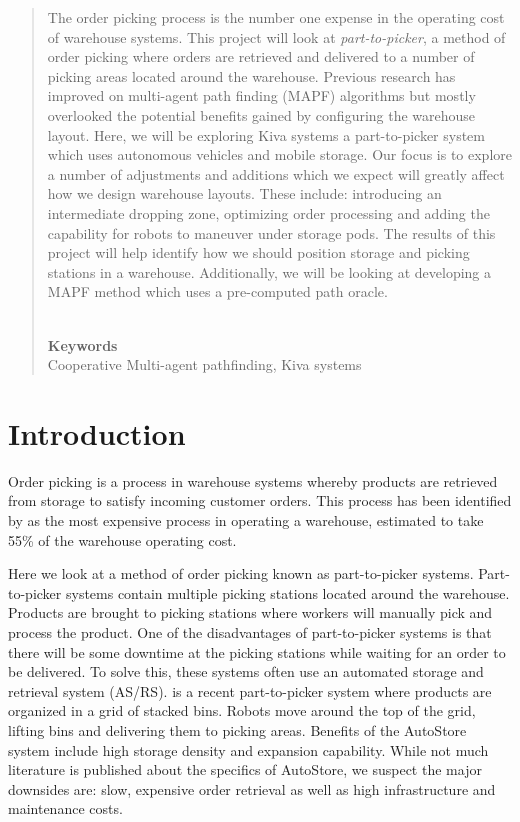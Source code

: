 \documentclass[a4paper,11pt]{article}
\begin{document}
	\begin{abstract} %
	
	\noindent The order picking process is the number one expense in the operating cost of warehouse systems. This project will look at \textit{part-to-picker}, a method of order picking where orders are retrieved and delivered to a number of picking areas located around the warehouse. Previous research has improved on multi-agent path finding (MAPF) algorithms but mostly overlooked the potential benefits gained by configuring the warehouse layout.
	Here, we will be exploring Kiva systems a part-to-picker system which uses autonomous vehicles and mobile storage. Our focus is to explore a number of adjustments and additions which we expect will greatly affect how we design warehouse layouts.
	These include: introducing an intermediate dropping zone, optimizing order processing and adding the capability for robots to maneuver under storage pods.
	The results of this project will help identify how we should position storage and picking stations in a warehouse. Additionally, we will be looking at developing a MAPF method which uses a pre-computed path oracle.
	
	\noindent \\ \textbf{Keywords} \\
	Cooperative Multi-agent pathfinding, Kiva systems
	
\end{abstract}
\section{Introduction}
Order picking is a process in warehouse systems whereby products are retrieved from storage to satisfy incoming customer orders. This process has been identified by \cite{de2007design} as the most expensive process in operating a warehouse, estimated to take 55\% of the warehouse operating cost.

Here we look at a method of order picking known as part-to-picker systems. Part-to-picker systems contain multiple picking stations located around the warehouse. Products are brought to picking stations where workers will manually pick and process the product. One of the disadvantages of part-to-picker systems is that there will be some downtime at the picking stations while waiting for an order to be delivered. To solve this, these systems often use an automated storage and retrieval system (AS/RS). \cite{introduction2015autostore} is a recent part-to-picker system where products are organized in a grid of stacked bins. Robots move around the top of the grid, lifting bins and delivering them to picking areas. Benefits of the AutoStore system include high storage density and expansion capability. While not much literature is published about the specifics of AutoStore, we suspect the major downsides are: slow, expensive order retrieval as well as high infrastructure and maintenance costs.
\end{document}
